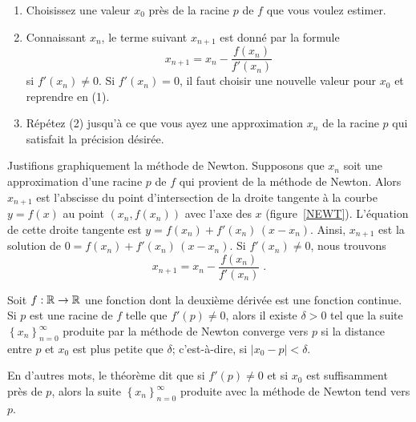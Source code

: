 {\begin{focus}{\mth} 
\begin{enumerate}
\item Choisissez une valeur $x_0$ près de la racine $p$ de $f$ que vous
voulez estimer.
\item Connaissant $x_n$, le terme suivant $x_{n+1}$ est donné par la
formule
\begin{equation} \label{newt_form}
x_{n+1}=x_n-\frac{f(x_n)}{f'(x_n)}
\end{equation}
si $f'(x_n)\neq 0$.  Si $f'(x_n)=0$, il faut choisir une nouvelle valeur pour
$x_0$ et reprendre en (1).
\item Répétez (2) jusqu'à ce que vous ayez une approximation $x_n$ de
la racine $p$ qui satisfait la précision désirée.
\end{enumerate}
\end{focus}

Justifions graphiquement la méthode de Newton.  Supposons que
$x_n$ soit une approximation d'une racine $p$ de $f$ qui provient de
la méthode de Newton.  Alors $x_{n+1}$ est l'abscisse du point
d'intersection de la droite tangente à la courbe $y=f(x)$ au point
$(x_n,f(x_n))$ avec l'axe des $x$ (figure~\ref{NEWT}).
L'équation de cette droite tangente est $y=f(x_n)+f'(x_n)\,(x-x_n)$.
Ainsi, $x_{n+1}$ est la solution de $0 = f(x_n)+f'(x_n)\,(x-x_n)$.  Si
$f'(x_n)\not=0$, nous trouvons
\[
x_{n+1} = x_n-\frac{f(x_n)}{f'(x_n)} \; .
\]


\begin{focus}[\theory]{\thm}
Soit $f:\mathbb{R}\rightarrow \mathbb{R}$ une fonction dont la deuxième
dérivée est une fonction continue.  Si $p$ est une racine de $f$
telle que $f'(p) \neq 0$, alors il existe $\delta > 0$ tel que la
suite $\displaystyle \left\{x_n\right\}_{n=0}^\infty$ produite par la
méthode de Newton converge vers $p$ si la distance entre $p$ et $x_0$
est plus petite que $\delta$; c'est-à-dire, si $|x_0-p|<\delta$.
\end{focus}

\begin{rmk}[\theory]
En d'autres mots, le théorème dit que si $f'(p)\neq 0$ et si $x_0$ est
suffisamment près de $p$, alors la suite
$\displaystyle \left\{x_n\right\}_{n=0}^\infty$ produite avec la
méthode de Newton tend vers $p$.


\end{rmk}}
